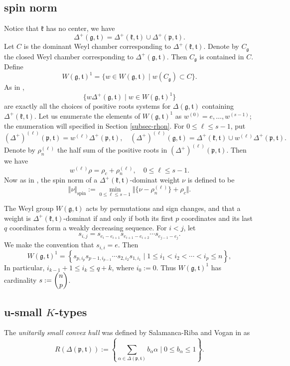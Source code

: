 \documentclass[11pt]{amsart}
\theoremstyle{plain}
\theoremstyle{definition}
\newcommand{\frg}{\mathfrak{g}}
\newcommand{\frk}{\mathfrak{k}}
\newcommand{\frp}{\mathfrak{p}}
\newcommand{\frt}{\mathfrak{t}}
\begin{document}
\subsection{spin norm}
Notice that $\frk$ has no center, we have
\[\Delta^+(\frg,\frt)=\Delta^+(\frk,\frt)\cup\Delta^+(\frp,\frt).\]
Let $C$ is the dominant Weyl chamber corresponding to $\Delta^+(\frk,\frt)$. Denote by $C_\frg$ the closed Weyl chamber corresponding to $\Delta^+(\frg,\frt)$. Then $C_\frg$ is contained in $C$. Define
\[W(\frg,\frt)^1=\{w\in W(\frg,\frt)\mid w(C_\frg)\subset C\}.\]
As in \cite{D20},
\[\{w\Delta^+(\frg,\frt)\mid w\in W(\frg,\frt)^1\}\]
are exactly all the choices of positive roots systems for $\Delta(\frg,\frt)$ containing $\Delta^+(\frk,\frt)$. Let us enumerate the elements of $W(\frg,\frt)^1$ as $w^{(0)}=e,\dots,w^{(s-1)}$; the enumeration will specified in Section \ref{subsec-rhon}. For $0\le \ell\le s-1$, put
\[(\Delta^+)^{(\ell)}(\frp,\frt)=w^{(\ell)}\Delta^+(\frp,\frt),\quad (\Delta^+)^{(\ell)}(\frg,\frt)=\Delta^+(\frk,\frt)\cup w^{(\ell)}\Delta^+(\frp,\frt).\]
Denote by $\rho_n^{(\ell)}$ the half sum of the positive roots in $(\Delta^+)^{(\ell)}(\frp,\frt)$. Then we have
\[w^{(\ell)}\rho=\rho_c+\rho_n^{(\ell)},\quad 0\le \ell\le s-1.\]
Now as in \cite{D13}, the spin norm of a $\Delta^+(\frk,\frt)$-dominat weight $\nu$ is defined to be
\[\Vert \nu \Vert_{\mathrm{spin}}:=\min_{0\le\ell\le s-1}\Vert \{\nu-\rho_n^{(\ell)}\}+\rho_c\Vert.\]

The Weyl group $W(\frg,\frt)$ acts by permutations and sign changes, and that a weight is $\Delta^+(\frk,\frt)$-dominat if and only if both its first $p$ coordinates and its last $q$ coordinates form a weakly decreasing sequence. For $i<j$, let
$$
s_{i,j}=s_{e_i-e_{i+1}} s_{e_{i+1}-e_{i+2}}\cdots s_{e_{j-1}-e_{j}}.
$$
We make the convention that $s_{i,i}=e$. Then
\[W(\frg,\frt)^1=\left\{s_{p,i_p} s_{p-1,i_{p-1}}\cdots s_{2,i_2} s_{1,i_1}\mid 1\le i_1<i_2<\cdots<i_p\le n\right\},\]
In particular, $i_{k-1}+1\le i_k\le q+k$, where $i_0:=0$. Thus $W(\frg,\frt)^1$ has cardinality
$s:=\dbinom{n}{p}$.

\subsection{u-small $K$-types}

The \emph{unitarily small convex hull} was defined by Salamanca-Riba and Vogan in \cite{SV} as
$$
R(\Delta(\frp, \frt)):=\left\{\sum_{\alpha\in\Delta(\frp, \frt)}  b_{\alpha} \alpha\mid 0\leq b_{\alpha}\leq 1\right\}.
$$
\end{document}
